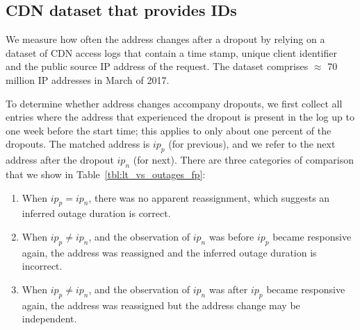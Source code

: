 \subsection{CDN dataset that provides IDs}

We measure how often the address changes after a dropout by relying on a dataset of CDN access logs that contain a time stamp, unique client identifier and the public source IP address of the request.  The dataset comprises $\approx$ 70 million IP addresses in March of 2017.


To determine whether address changes accompany dropouts, we
first collect all entries where the address that experienced
the dropout is present in the log up to one week before the
start time; this applies to only about one percent of the
dropouts.  The matched address is $ip_p$ (for previous), and
we refer to the next address after the dropout $ip_n$ (for
next).  There are three categories of comparison that we
show in Table~\ref{tbl:lt_vs_outages_fp}:
\begin{enumerate}
\item When $ip_p = ip_n$, there was no apparent
  reassignment, which suggests an inferred outage duration
  is correct.
\item When $ip_p \not= ip_n$, and the observation of $ip_n$
  was before $ip_p$ became responsive again, the address was
  reassigned and the inferred outage duration is incorrect.
\item When $ip_p \not= ip_n$, and the observation of $ip_n$
  was after $ip_p$ became responsive again, the address was
  reassigned but the address change may be independent.
\end{enumerate}

